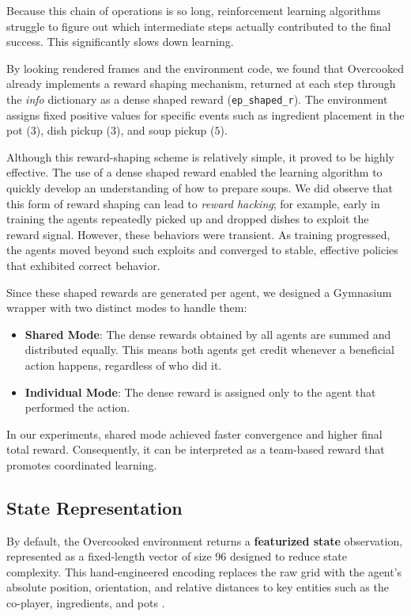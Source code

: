 \documentclass{article}
\begin{document}
Because this chain of operations is so long, reinforcement learning algorithms
struggle to figure out which intermediate steps actually contributed to the
final success. This significantly slows down learning.

By looking rendered frames and the environment code, we found that Overcooked
already implements a reward shaping mechanism, returned at each step through
the \textit{info} dictionary as a dense shaped reward
(\texttt{ep\_shaped\_r}). The environment assigns fixed positive values for
specific events such as ingredient placement in the pot ($3$), dish pickup
($3$), and soup pickup ($5$).

Although this reward-shaping scheme is relatively simple, it proved to be
highly effective. The use of a dense shaped reward enabled the learning
algorithm to quickly develop an understanding of how to prepare soups. We did
observe that this form of reward shaping can lead to \textit{reward hacking};
for example, early in training the agents repeatedly picked up and dropped
dishes to exploit the reward signal. However, these behaviors were transient.
As training progressed, the agents moved beyond such exploits and converged to
stable, effective policies that exhibited correct behavior.

Since these shaped rewards are generated per agent, we designed a Gymnasium
wrapper with two distinct modes to handle them:
\begin{itemize}
    \item \textbf{Shared Mode}: The dense rewards obtained by all agents are
        summed and distributed equally. This means both agents get credit
        whenever a beneficial action happens, regardless of who did it.
    \item \textbf{Individual Mode}: The dense reward is assigned only to the
        agent that performed the action.
\end{itemize}

In our experiments, shared mode achieved faster convergence and higher final
total reward. Consequently, it can be interpreted as a team-based reward that
promotes coordinated learning.

\subsection{State Representation}

By default, the Overcooked environment returns a \textbf{featurized state}
observation, represented as a fixed-length vector of size 96 designed to
reduce state complexity. This hand-engineered encoding replaces the raw grid
with the agent's absolute position, orientation, and relative distances to key
entities such as the co-player, ingredients, and pots \cite{cai2021overcooked}.
\end{document}
